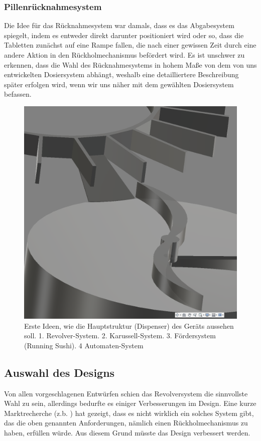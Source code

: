 \subsubsection{Pillenrücknahmesystem}
Die Idee für das Rücknahmesystem war damals, dass es das Abgabesystem spiegelt, indem es entweder direkt darunter positioniert wird oder so, dass die Tabletten zunächst auf eine Rampe fallen, die nach einer gewissen Zeit durch eine andere Aktion in den Rückholmechanismus befördert wird. Es ist unschwer zu erkennen, dass die Wahl des Rücknahmesystems in hohem Maße von dem von uns entwickelten Dosiersystem abhängt, weshalb eine detailliertere Beschreibung später erfolgen wird, wenn wir uns näher mit dem gewählten Dosiersystem befassen.
\begin{figure}[h]
	\centering
	\includegraphics[width=0.7\linewidth]{Figures/Screenshot_1.png} 
	\caption[Frühe Entwürfe]{Erste Ideen, wie die Hauptstruktur (Dispenser) des Geräts aussehen soll. 1. Revolver-System. 2. Karussell-System. 3. Fördersystem (Running Sushi). 4 Automaten-System }
	\label{fig:designs}
\end{figure}
\newpage
\subsection{Auswahl des Designs}
Von allen vorgeschlagenen Entwürfen schien das Revolversystem die sinnvollste Wahl zu sein, allerdings bedurfte es einiger Verbesserungen im Design. Eine kurze Marktrecherche (z.b. \cite{LiveFinePillDispenser} \cite{zoksi_pill_organizer}) hat gezeigt, dass es nicht wirklich ein solches System gibt, das die oben genannten Anforderungen, nämlich einen Rückholmechanismus zu haben, erfüllen würde. Aus diesem Grund müsste das Design verbessert werden.
